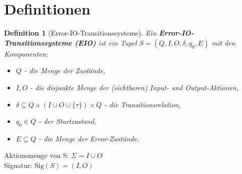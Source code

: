 \documentclass[mathserif]{beamer}
\newtheorem{Def}{Definition}
\newcommand{\EIO}{EIO}
\begin{document}
\section{Definitionen}
\begin{frame}
  \begin{Def}[Error-IO-Transitionssysteme]
    Ein \textbf{Error-IO-Transitionssysteme (\EIO{})} ist ein Tupel $S=(Q,I,O,\delta
    ,q_0,E)$ mit den Komponenten:
    \begin{itemize}
      \item $Q$ - die Menge der Zustände,
      \item $I,O$ - die disjunkte Menge der (sichtbaren) Input- und
        Output-Aktionen,
      \item $\delta\subseteq Q\times (I\cup O\cup \{\tau\})\times Q$ - die
        Transitionsrelation,
      \item $q_0\in Q$ - der Startzustand,
      \item $E\subseteq Q$ - die Menge der Error-Zustände.
    \end{itemize}
  \end{Def}
  Aktionsmenge von S: $\Sigma = I\cup O$\\
  Signatur: $\mathrm{Sig}(S)= (I,O)$
\end{frame}
\end{document}

